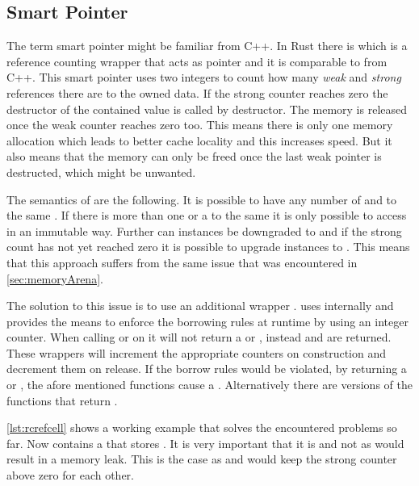 \documentclass[thesis]{subfiles}
\begin{document}
  \subsection{Smart Pointer}
    The term smart pointer might be familiar from C++.
    In Rust there is \RcT which is a reference counting wrapper that acts as pointer and it is comparable to  from C++.
    This smart pointer uses two integers to count how many \emph{weak} and \emph{strong} references there are to the owned data.
    If the strong counter reaches zero the destructor of the contained value is called by \RcTs destructor.
    The memory is released once the weak counter reaches zero too.
    This means there is only one memory allocation which leads to better cache locality and this increases speed.
    But it also means that the memory can only be freed once the last weak pointer is destructed, which might be unwanted.
    \autocite[std::rc::Rc]{rust-doc}

    The semantics of \RcT are the following.
    It is possible to have any number of \RcTs and \WeakTs to the same \T.
    If there is more than one \RcT or a \WeakT to the same \T it is only possible to access \T in an immutable way.
    Further can \RcT instances be downgraded to \WeakT and if the strong count has not yet reached zero it is possible to upgrade \WeakT instances to \RcT.
    This means that this approach suffers from the same issue that was encountered in \autoref{sec:memoryArena}.\autocite[std::rc::Rc]{rust-doc}

    The solution to this issue is to use an additional wrapper \RcRefCellT.
    \RefCellT uses internally  and provides the means to enforce the borrowing rules at runtime by using an integer counter.
    When calling  or  on \RefCellT it will not return a  or , instead \RefT and \RefMutT are returned.
    These wrappers will increment the appropriate counters on construction and decrement them on release.
    If the borrow rules would be violated, by returning a \RefT or \RefMutT, the afore mentioned functions cause a \panic.
    Alternatively there are  versions of the functions that return .\autocite[std::cell::RefCell]{rust-doc}


    \autoref{lst:rcrefcell} shows a working example that solves the encountered problems so far.
    Now \Node contains a  that stores \WeakT.
    It is very important that it is \WeakT and not \RcT as \RcT would result in a memory leak.
    This is the case as  and  would keep the strong counter above zero for each other.
\end{document}
